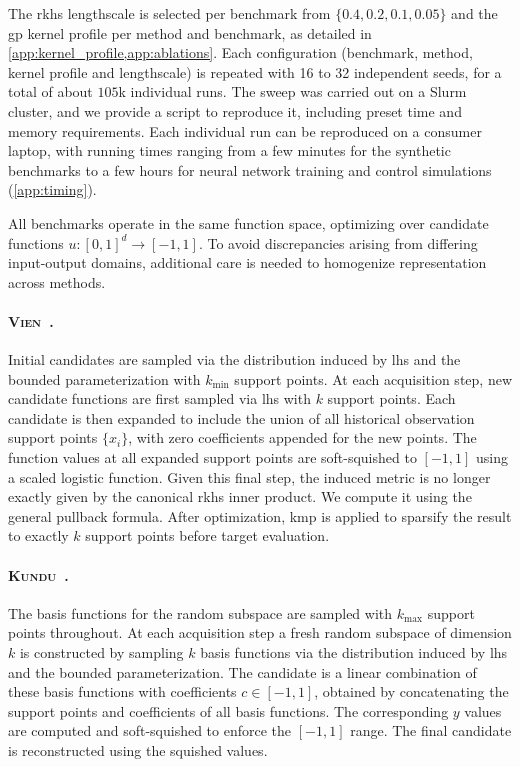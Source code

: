 \documentclass{article}
\newcommand{\vien}{\textsc{Vien}~\cite{vien2018bayesian}}
\newcommand{\kundu}{\textsc{Kundu}~\cite{kundu2025active}}
\newcommand{\vu}{u}
\begin{document}
The \gls{rkhs} lengthscale is selected per benchmark from $\{0.4, 0.2, 0.1, 0.05\}$ and the \gls{gp} kernel profile per method and benchmark, as detailed in \cref{app:kernel_profile,app:ablations}.
Each configuration (benchmark, method, kernel profile and lengthscale) is repeated with 16 to 32 independent seeds, for a total of about $105$k individual runs.
The sweep was carried out on a Slurm cluster, and we provide a script to reproduce it, including preset time and memory requirements.
Each individual run can be reproduced on a consumer laptop, with running times ranging from a few minutes for the synthetic benchmarks to a few hours for neural network training and control simulations (\cref{app:timing}).

All benchmarks operate in the same function space, optimizing over candidate functions $\vu:[0,1]^d\to[-1,1]$.
To avoid discrepancies arising from differing input-output domains, additional care is needed to homogenize representation across methods.

\paragraph{\vien.}
Initial candidates are sampled via the distribution induced by \gls{lhs} and the bounded parameterization with $k_{\min}$ support points.
At each acquisition step, new candidate functions are first sampled via \gls{lhs} with $k$ support points.
Each candidate is then expanded to include the union of all historical observation support points $\{x_i\}$, with zero coefficients appended for the new points.
The function values at all expanded support points are soft-squished to $[-1,1]$ using a scaled logistic function.
Given this final step, the induced metric is no longer exactly given by the canonical \gls{rkhs} inner product. We compute it using the general pullback formula.
After optimization, \gls{kmp} \citep{vincent2002kernel} is applied to sparsify the result to exactly $k$ support points before target evaluation.

\paragraph{\kundu.}
The basis functions for the random subspace are sampled with $k_{\max}$ support points throughout.
At each acquisition step a fresh random subspace of dimension $k$ is constructed by sampling $k$ basis functions via the distribution induced by \gls{lhs} and the bounded parameterization.
The candidate is a linear combination of these basis functions with coefficients $c \in [-1,1]$, obtained by concatenating the support points and coefficients of all basis functions.
The corresponding $y$ values are computed and soft-squished to enforce the $[-1,1]$ range.
The final candidate is reconstructed using the squished values.
\end{document}
